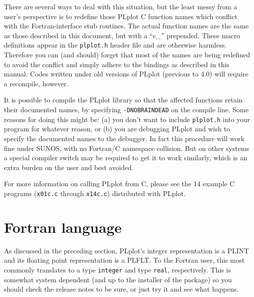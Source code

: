 There are several ways to deal with this situation, but the least messy from
a user's perspective is to redefine those PLplot C function names which
conflict with the Fortran-interface stub routines.  The actual function
names are the same as those described in this document, but with a ``c\_''
prepended.  These macro definitions appear in the {\tt plplot.h} header file
and are otherwise harmless.  Therefore you can (and should) forget that most
of the names are being redefined to avoid the conflict and simply adhere to
the bindings as described in this manual.  Codes written under old versions
of PLplot (previous to 4.0) will require a recompile, however.

It is possible to compile the PLplot library so that the affected functions
retain their documented names, by specifying {\tt -DNOBRAINDEAD} on the
compile line.  Some reasons for doing this might be:  (a) you don't want to
include {\tt plplot.h} into your program for whatever reason, or (b) you are
debugging PLplot and wish to specify the documented names to the debugger.
In fact this procedure will work fine under SUNOS, with no Fortran/C
namespace collision.  But on other systems a special compiler switch may be
required to get it to work similarly, which is an extra burden on the user
and best avoided.

For more information on calling PLplot from C, please see the 14 example C
programs ({\tt x01c.c} through {\tt x14c.c}) distributed with PLplot.

\section {Fortran language}

As discussed in the preceding section, PLplot's integer representation is a
PLINT and its floating point representation is a PLFLT.  To the
Fortran user, this most commonly translates to a type {\tt integer} and
type {\tt real}, respectively.  This is somewhat system dependent (and up to
the installer of the package) so you should check the release notes to be
sure, or just try it and see what happens.

